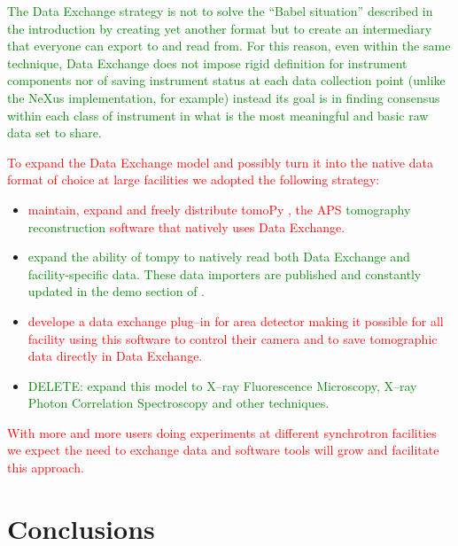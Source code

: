 \documentclass[pdf]{iucr}              %
\begin{document}
\textcolor{green}{The Data Exchange strategy is not to solve the ``Babel situation'' described in the introduction by creating yet another format but to create an intermediary that everyone can export to and read from. For this reason, even within the same technique, Data Exchange does not impose rigid definition for instrument components nor of saving instrument status at each data collection point (unlike the NeXus implementation, for example) instead its goal is in finding consensus within each class of instrument in what is the most meaningful and basic raw data set to share.}

\textcolor{red}{To expand the Data Exchange model and possibly turn it into the native data format of choice at large facilities we adopted the following strategy:}

\begin{itemize}
    \item \textcolor{red}{maintain, expand and freely distribute tomoPy \cite{python_cpp}, the APS \textcolor{green}{tomography reconstruction} software that natively uses Data Exchange.} 
\item \textcolor{green}{expand the ability of tompy to natively read both Data Exchange and facility-specific data. These data importers are published and constantly updated in the demo section of \cite{data_exchange}.}
\item \textcolor{red}{develope a data exchange plug--in for area detector \cite{area_detector} making it possible for all facility using this software to control their camera and to save tomographic data directly in Data Exchange.}
\item \textcolor{green}{DELETE: expand this model to X--ray Fluorescence Microscopy, X--ray Photon Correlation Spectroscopy and other techniques.}
\end{itemize}


\textcolor{red}{With more and more users doing experiments at different synchrotron facilities we expect the need to exchange data and software tools will grow and facilitate this approach.}
 

\section{Conclusions}
\end{document}
